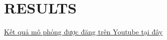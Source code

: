 \chapter{RESULTS}
\href{https://www.youtube.com/watch?v=eX1qE90ZBqs}{Kết quả mô phỏng được đăng trên Youtube tại đây}
